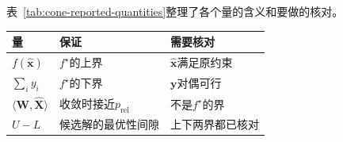 表~\ref{tab:cone-reported-quantities}整理了各个量的含义和要做的核对。

\begin{BookInlineTable}
  \centering
  \begin{tabular}{lll}
    \toprule
    量 & 保证 & 需要核对\\
    \midrule
    $f(\hat{\bm{x}})$ & $f^\star$的上界 & $\hat{\bm{x}}$满足原约束\\
    $\sum_iy_i$ & $f^\star$的下界 & $\bm{y}$对偶可行\\
    $\langle\bm{W},\hat{\bm{X}}\rangle$ & 收敛时接近$p_{\mathrm{rel}}$ & 不是$f^\star$的界\\
    $U-L$ & 候选解的最优性间隙 & 上下两界都已核对\\
    \bottomrule
  \end{tabular}
  \caption{半正定松弛的结果中各个量的含义。}
  \label{tab:cone-reported-quantities}
\end{BookInlineTable}
